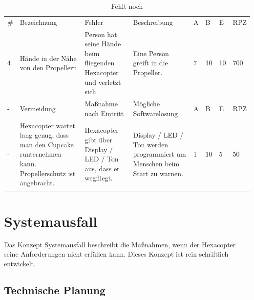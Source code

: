 \begin{longtable}{|p{0.4cm}|p{3.0cm}|p{3.1cm}|p{3.1cm}|p{0.4cm}|p{0.4cm}|p{0.4cm}|p{0.8cm}|}
\hline \#   & Bezeichnung                                                                                               & Fehler                                                                                                                & Beschreibung                                                                                                                    & A   & B   & E   & RPZ \\
 4          & Hände in der Nähe von den Propellern                                                                      & Person hat seine Hände beim fliegenden Hexacopter und verletzt sich                                                   & Eine Person greift in die Propeller.                                                                                            & 7   & 10  & 10  & 700 \\
\hline -    & Vermeidung                                                                                                & Maßnahme nach Eintritt                                                                                                & Mögliche Softwarelösung                                                                                                         & A   & B   & E   & RPZ \\
 -          & Hexacopter wartet lang genug, dass man den Cupcake runternehmen kann. Propellerschutz ist angebracht.     & Hexacopter gibt über Display / LED / Ton aus, dass er wegfliegt.                                                      & Display / LED / Ton werden programmiert um Menschen beim Start zu warnen.                                                       & 1   & 10  & 5   & 50  \\\hline
 \caption{Fehlt noch}
\end{longtable}


\section{Systemausfall}

Das Konzept Systemausfall beschreibt die Maßnahmen, wenn der Hexacopter seine Anforderungen nicht erfüllen kann. Dieses Konzept ist rein schriftlich entwickelt.

  \subsection{Technische Planung}

